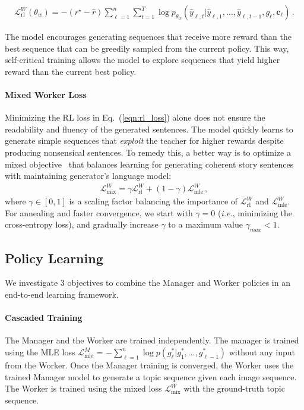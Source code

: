 \documentclass[letterpaper]{article} \usepackage{aaai19}  \usepackage{times}  \usepackage{helvet}  \usepackage{courier}  \usepackage{url}  \usepackage{graphicx}
\newcommand{\cv}{{\boldsymbol c}}
\newcommand{\Lcal}{\mathcal{L}}
\begin{document}
\begin{adjustbox}{minipage=1.10\linewidth,scale=0.88}
	\begin{align}
		\Lcal_{\textrm{rl}}^W (\theta_w) = -(r^{\star}-\hat{r}) \sum_{\ell=1}^n  \sum_{t=1}^{T}\log p_{\theta_w}(\hat{y}_{\ell,t}|\hat{y}_{\ell,1},\ldots,\hat{y}_{\ell,t-1},g_{\ell},\cv_{\ell})\,.
		\label{eqn:rl_loss}
	\end{align} 
\end{adjustbox}
The model encourages generating sequences that receive more reward than the best sequence that can be greedily sampled from the current policy. This way, self-critical training allows the model to explore sequences that yield higher reward than the current best policy. 
\paragraph{Mixed Worker Loss}
Minimizing the RL loss in Eq.~(\ref{eqn:rl_loss}) alone does not ensure the readability and fluency of the generated sentences. The model quickly learns to generate simple sequences that \textit{exploit} the teacher for higher rewards despite producing nonsensical sentences. To remedy this, a better way is to optimize a mixed objective~\cite{wu2016google,Pasunuru2017Reinforced} that balances learning for generating coherent story sentences with maintaining generator's language model:
\begin{align}
	\Lcal_{\textrm{mix}}^W = \gamma \Lcal_{\textrm{rl}}^W  +(1-\gamma) \Lcal_{\textrm{mle}}^W \,,
	\label{eqn:mixedLoss}
\end{align}
where $\gamma \in [0,1]$ is a scaling factor balancing the importance of $\Lcal_{\textrm{rl}}^W$ and $\Lcal_{\textrm{mle}}^W$. 
For annealing and faster convergence, we start with $\gamma=0$ (\emph{i.e.}, minimizing the cross-entropy loss), and gradually increase $\gamma$ to a maximum value $\gamma_{max}<1$.
\subsection{Policy Learning} \label{subsec:End-to-EndTraining}
We investigate 3 objectives to combine the Manager and Worker policies in an end-to-end learning framework. 

\paragraph{Cascaded Training}
The Manager and the Worker are trained independently. The manager is trained using the MLE loss $\Lcal_{\textrm{mle}}^M$ = $-\sum_{\ell=1}^{n} \log p(g_{\ell}^*|g_{1}^*,\ldots,g_{\ell-1}^*)$ without any input from the Worker. Once the Manager training is converged, the Worker uses the trained Manager model to generate a topic sequence given each image sequence. 
The Worker is trained using the mixed loss $\Lcal_{\textrm{mix}}^W$ with the ground-truth topic sequence. 
\end{document}
